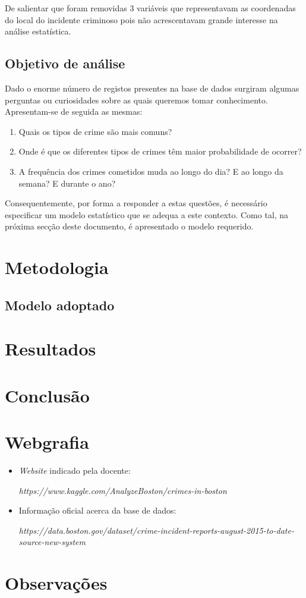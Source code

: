 \documentclass[a4paper]{report}
\begin{document}
{	De salientar que foram removidas 3 variáveis que representavam as coordenadas do local do incidente criminoso pois não acrescentavam grande interesse na análise estatística. 
	
	\section{Objetivo de análise}
	Dado o enorme número de registos presentes na base de dados surgiram algumas perguntas ou curiosidades sobre as quais queremos tomar conhecimento. Apresentam-se de seguida as mesmas:
	\begin{enumerate}
	    \item Quais os tipos de crime são mais comuns?
	    \item Onde é que os diferentes tipos de crimes têm maior probabilidade de ocorrer?
	    \item A frequência dos crimes cometidos muda ao longo do dia? E ao longo da semana? E durante o ano?
	\end{enumerate}
	
	Consequentemente, por forma a responder a estas questões, é necessário especificar um modelo estatístico que se adequa a este contexto. Como tal, na próxima secção deste documento, é apresentado o modelo requerido.
}

\chapter{Metodologia}
    \section{Modelo adoptado}

\chapter{Resultados}

\chapter{Conclusão}

\chapter{Webgrafia}
    \begin{itemize}
        \item \textit{Website} indicado pela docente:
        \par \textit{https://www.kaggle.com/AnalyzeBoston/crimes-in-boston}
        \item Informação oficial acerca da base de dados:
        \par \textit{https://data.boston.gov/dataset/crime-incident-reports-august-2015-to-date-source-new-system}
    \end{itemize}

\appendix
\chapter{Observações}
\end{document}
